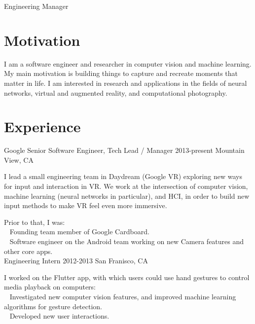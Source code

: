 \documentclass{kaeserchen_cv}
\begin{document}
\thispagestyle{empty}
\subtitle{Software Engineer}{Engineering Manager}


\section{Motivation}
\begin{flushleft}
I am a software engineer and researcher in computer vision and machine learning.
My main motivation is building things to capture and recreate moments that
matter in life. I am interested in research and applications in the fields of
neural networks, virtual and augmented reality, and computational photography.
\end{flushleft}

\section{Experience}
\begin{flushleft}
\experienceentry
    {Google}
    {Senior Software Engineer, Tech Lead / Manager}
    {2013-present}
    {Mountain View, CA}

I lead a small engineering team in Daydream (Google VR) exploring new ways
for input and interaction in VR. We work at the intersection of computer
vision, machine learning (neural networks in particular), and HCI, in order
to build new input methods to make VR feel even more immersive. \\
\end{flushleft}

Prior to that, I was: \\
\textbullet ~ Founding team member of Google Cardboard. \\
\textbullet ~ Software engineer on the Android team working on new Camera features
              and other core apps. \\

                {Engineering Intern}
                {2012-2013}
                {San Franisco, CA}

I worked on the Flutter app, with which users could use hand gestures to control media playback on computers: \\
\textbullet ~ Investigated new computer vision features, and 
              improved machine learning algorithms for gesture detection. \\
\textbullet ~ Developed new user interactions. \\
\end{document}
